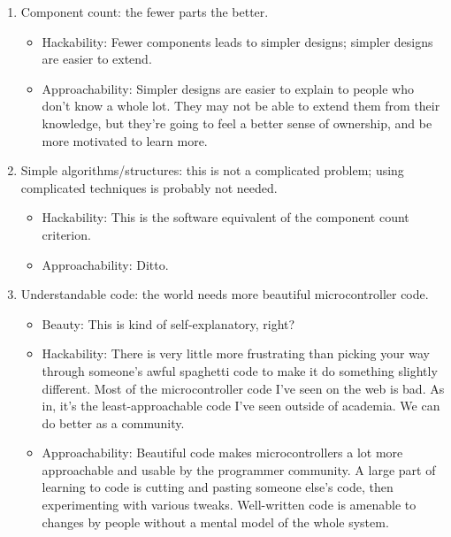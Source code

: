 \begin{enumerate}
\item Component count: the fewer parts the better.
\begin{itemize}
\item Hackability: Fewer components leads to simpler designs; simpler
  designs are easier to extend.
\item Approachability: Simpler designs are easier to explain to people
  who don't know a whole lot.  They may not be able to extend them
  from their knowledge, but they're going to feel a better sense of
  ownership, and be more motivated to learn more.
\end{itemize}

\item Simple algorithms/structures: this is not a complicated problem; using
  complicated techniques is probably not needed.
\begin{itemize}
\item Hackability: This is the software equivalent of the component
  count criterion.
\item Approachability: Ditto.
\end{itemize}

\item Understandable code: the world needs more beautiful
  microcontroller code.
\begin{itemize}
\item Beauty: This is kind of self-explanatory, right?
\item Hackability: There is very little more frustrating than picking
  your way through someone's awful spaghetti code to make it do
  something slightly different.  Most of the microcontroller code I've
  seen on the web is bad.  As in, it's the least-approachable code
  I've seen outside of academia.  We can do better as a community.
\item Approachability: Beautiful code makes microcontrollers a lot
  more approachable and usable by the programmer community.  A large
  part of learning to code is cutting and pasting someone else's code,
  then experimenting with various tweaks.  Well-written code is
  amenable to changes by people without a mental model of the whole
  system.
\end{itemize}


\end{enumerate}

